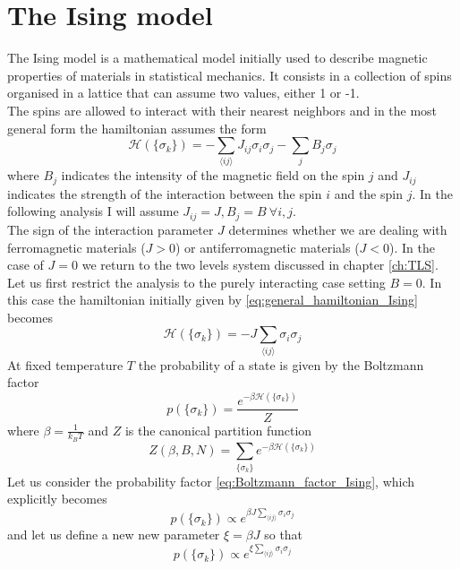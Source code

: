 \section{The Ising model}
The Ising model is a mathematical model initially used to describe magnetic properties of materials in statistical mechanics. It consists in a collection of spins 
organised in a lattice that can assume two values, either 1 or -1. \\
The spins are allowed to interact with their nearest neighbors and in the most general form the hamiltonian assumes the form
\begin{equation}
    \mathcal{H}(\{\sigma_k\}) = -\sum_{\langle i j\rangle} J_{i j} \sigma_{i} \sigma_{j} - \sum_{j} B_j\sigma_{j}
    \label{eq:general_hamiltonian_Ising}
\end{equation}
where $B_j$ indicates the intensity of the magnetic field on the spin $j$ and $J_{ij}$ indicates the strength of the interaction between the spin $i$ and the spin $j$.
In the following analysis I will assume $J_{ij} = J, B_j = B \ \forall i,j$. \\
The sign of the interaction parameter $J$ determines whether we are dealing with ferromagnetic materials ($J>0$) or antiferromagnetic materials ($J < 0$). In the case of $J=0$
we return to the two levels system discussed in chapter \ref{ch:TLS}. \\
Let us first restrict the analysis to the purely interacting case setting $B=0$. In this case the hamiltonian initially given by \ref{eq:general_hamiltonian_Ising} becomes
\begin{equation*}
    \mathcal{H}(\{\sigma_k\}) = -J \sum_{\langle i j\rangle}\sigma_{i} \sigma_{j}
\end{equation*}
At fixed temperature $T$ the probability of a state is given by the Boltzmann factor
\begin{equation}
    p(\{\sigma_k\}) = \frac{e^{-\beta\mathcal{H}(\{\sigma_k\})}}{Z}
    \label{eq:Boltzmann_factor_Ising}
\end{equation}
where $\beta = \frac{1}{k_BT}$ and $Z$ is the canonical partition function
\begin{equation*}
    Z(\beta, B, N) = \sum_{\{\sigma_k\}} e^{-\beta\mathcal{H}(\{\sigma_k\})}
\end{equation*}
Let us consider the probability factor \ref{eq:Boltzmann_factor_Ising}, which explicitly becomes 
\begin{equation*}
    p(\{\sigma_k\}) \propto e^{\beta J \sum_{\langle i j\rangle}\sigma_{i} \sigma_{j}}
\end{equation*}
and let us define a new new parameter $\xi = \beta J$ so that 
\begin{equation}
    p(\{\sigma_k\}) \propto e^{\xi \sum_{\langle i j\rangle}\sigma_{i} \sigma_{j}}
    \label{eq:probability_Ising}
\end{equation}

